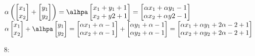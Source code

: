 \begin{solution}
		   \begin{center}
		    $
		    \alpha \left(
		    \begin{bmatrix}
		    x_1 \\ x_2
		    \end{bmatrix}
		    + 
		    \begin{bmatrix}
		    y_1 \\ y_2
		    \end{bmatrix}
		    \right)
		    =
		    \alhpa
		    \begin{bmatrix}
		        x_1 + y_1 +1\\ x_2 + y2 +1
		    \end{bmatrix}
		    =
		    \begin{bmatrix}
		        \alpha x_1 + \alpha y_1 -1\\ \alpha x_2 + \alpha y2 -1
		    \end{bmatrix}
		    $
		    \\
		    $
		    \alpha
		    \begin{bmatrix}
		    x_1 \\ x_2
		    \end{bmatrix}
		    +
		    \alhpa
		    \begin{bmatrix}
		    y_1 \\ y_2
		    \end{bmatrix}
		    =
		    \begin{bmatrix}
		    \alpha x_1 + \alpha -1 \\ \alpha x_2 + \alpha -1
		    \end{bmatrix}
		    +
		    \begin{bmatrix}
		    \alpha y_1 + \alpha -1 \\ \alpha y_2 + \alpha -1
		    \end{bmatrix}
		    =
		   \begin{bmatrix}
		    \alpha x_1 + \alpha y_1 + 2 \alpha -2 +1 \\ \alpha x_2 + \alpha y_2 + 2 \alpha -2 +1
		    \end{bmatrix}
		    $
		    \end{center}
		   
		   
		   8:\\
		   

\end{solution}
